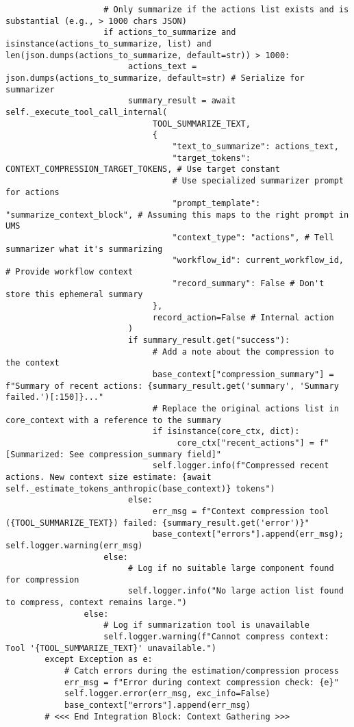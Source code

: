 \documentclass[12pt,a4paper]{article}
\begin{document}
\begin{pageablecode}
\begin{verbatim}
                    # Only summarize if the actions list exists and is substantial (e.g., > 1000 chars JSON)
                    if actions_to_summarize and isinstance(actions_to_summarize, list) and len(json.dumps(actions_to_summarize, default=str)) > 1000:
                         actions_text = json.dumps(actions_to_summarize, default=str) # Serialize for summarizer
                         summary_result = await self._execute_tool_call_internal(
                              TOOL_SUMMARIZE_TEXT,
                              {
                                  "text_to_summarize": actions_text,
                                  "target_tokens": CONTEXT_COMPRESSION_TARGET_TOKENS, # Use target constant
                                  # Use specialized summarizer prompt for actions
                                  "prompt_template": "summarize_context_block", # Assuming this maps to the right prompt in UMS
                                  "context_type": "actions", # Tell summarizer what it's summarizing
                                  "workflow_id": current_workflow_id, # Provide workflow context
                                  "record_summary": False # Don't store this ephemeral summary
                              },
                              record_action=False # Internal action
                         )
                         if summary_result.get("success"):
                              # Add a note about the compression to the context
                              base_context["compression_summary"] = f"Summary of recent actions: {summary_result.get('summary', 'Summary failed.')[:150]}..."
                              # Replace the original actions list in core_context with a reference to the summary
                              if isinstance(core_ctx, dict):
                                   core_ctx["recent_actions"] = f"[Summarized: See compression_summary field]"
                              self.logger.info(f"Compressed recent actions. New context size estimate: {await self._estimate_tokens_anthropic(base_context)} tokens")
                         else:
                              err_msg = f"Context compression tool ({TOOL_SUMMARIZE_TEXT}) failed: {summary_result.get('error')}"
                              base_context["errors"].append(err_msg); self.logger.warning(err_msg)
                    else:
                         # Log if no suitable large component found for compression
                         self.logger.info("No large action list found to compress, context remains large.")
                else:
                    # Log if summarization tool is unavailable
                    self.logger.warning(f"Cannot compress context: Tool '{TOOL_SUMMARIZE_TEXT}' unavailable.")
        except Exception as e:
            # Catch errors during the estimation/compression process
            err_msg = f"Error during context compression check: {e}"
            self.logger.error(err_msg, exc_info=False)
            base_context["errors"].append(err_msg)
        # <<< End Integration Block: Context Gathering >>>


\end{verbatim}
\end{pageablecode}
\end{document}
